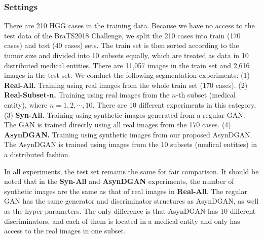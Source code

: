 \subsubsection{Settings}
There are 210 HGG cases in the training data. Because we have no access to the test data of the BraTS2018 Challenge, we split the 210 cases into train (170 cases) and test (40 cases) sets. The train set is then sorted according to the tumor size and divided into 10 subsets equally, which are treated as data in 10 distributed medical entities. There are 11,057 images in the train set and 2,616 images in the test set. We conduct the following segmentation experiments:
(1) \textbf{Real-All.} Training using real images from the whole train set (170 cases).
(2) \textbf{Real-Subset-n.} Training using real images from the $n$-th subset (medical entity), where $n=1,2,\cdots,10$. There are 10 different experiments in this category.
(3) \textbf{Syn-All.} Training using synthetic images generated from a regular GAN. The GAN is trained directly using all real images from the 170 cases.
(4) \textbf{AsynDGAN.} Training using synthetic images from our proposed AsynDGAN.
The AsynDGAN is trained using images from the 10 subsets (medical entities) in a distributed fashion.

In all experiments, the test set remains the same for fair comparison. It should be noted that in the \textbf{Syn-All} and \textbf{AsynDGAN} experiments, the number of synthetic images are the same as that of real images in \textbf{Real-All}. The regular GAN has the same generator and discriminator structures as AsynDGAN, as well as the hyper-parameters. The only difference is that AsynDGAN has 10 different discriminators, and each of them is located in a medical entity and only has access to the real images in one subset.

